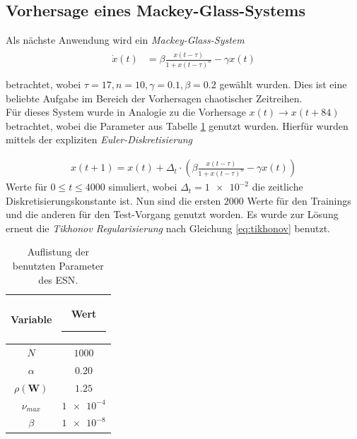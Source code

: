 \clearpage

\subsection{Vorhersage eines Mackey-Glass-Systems}
\label{sec:mackey_glass}
Als nächste Anwendung wird ein \textit{Mackey-Glass-System}
\begin{align}
\label{eq:application_mackey_glass_pde}
\begin{split}
\dot{x}(t) &= \beta \frac{x(t-\tau)}{1+x(t-\tau)^n}-\gamma x(t)\\
\end{split}
\end{align}
betrachtet, wobei $\tau = 17, n=10, \gamma=0.1, \beta = 0.2$ gewählt wurden. Dies ist eine beliebte Aufgabe im Bereich der Vorhersagen chaotischer Zeitreihen.\\
Für dieses System wurde in Analogie zu  \citep{caraballo2014} die Vorhersage $x(t) \rightarrow x(t+84)$ betrachtet, wobei die Parameter aus Tabelle \ref{tab:application_mackeyglass} genutzt wurden. Hierfür wurden mittels der expliziten \textit{Euler-Diskretisierung} 

\begin{align}
x(t+1) = x(t) + \Delta_t \cdot \left(\beta \frac{x(t-\tau)}{1+x(t-\tau)^n}-\gamma x(t)  \right)
\end{align}
Werte für $0 \leq t \leq 4000$ simuliert, wobei $\Delta_t=\num{1e-2}$ die zeitliche Diskretisierungskonstante ist. Nun sind die ersten $2000$ Werte für den Trainings und die anderen für den Test-Vorgang genutzt worden. Es wurde zur Lösung erneut die \textit{Tikhonov Regularisierung} nach Gleichung \ref{eq:tikhonov} benutzt.

\begin{table}[H]
	\centering
		\begin{tabular}{|c|c|}
		\rule[-1ex]{0pt}{3.5ex} Variable & \hspace{4ex} Wert \rule[-1ex]{4ex}{0pt}\\ 
		\hline \hline 
		\rule[-1ex]{0pt}{3.5ex} $N$ & $1000$ \\ 
		\hline 
		\rule[-1ex]{0pt}{3.5ex} $\alpha$ & $0.20$ \\ 
		\hline 
		\rule[-1ex]{0pt}{3.5ex} $\rho(\mathbf{W})$ & $1.25$ \\ 
		\hline 
		\rule[-1ex]{0pt}{3.5ex} $\nu_{max}$ & $\num{1e-4}$ \\ 
		\hline 
		\rule[-1ex]{0pt}{3.5ex} $\beta$ & $\num{1e-8}$ \\ 
		\hline 
	\end{tabular} 
	\caption{Auflistung der benutzten Parameter des \textsc{ESN}.}
\label{tab:application_mackeyglass}
\end{table}

